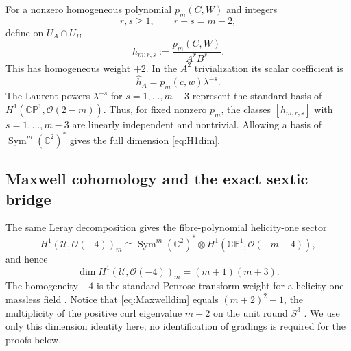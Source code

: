 \documentclass[aps,prd,reprint,nofootinbib,superscriptaddress]{revtex4-2}
\theoremstyle{definition}
\theoremstyle{remark}
\newcommand{\C}{\mathbb{C}}
\newcommand{\CP}{\mathbb{CP}}
\newcommand{\cO}{\mathcal{O}}
\newcommand{\cU}{\mathcal{U}}
\newcommand{\Sym}{\operatorname{Sym}}
\begin{document}
For a nonzero homogeneous polynomial $p_m(C,W)$ and integers
\begin{equation}
r,s\ge1,
\qquad r+s=m-2,
\label{eq:rs}
\end{equation}
define on $U_A\cap U_B$
\begin{equation}
h_{m;r,s}:=\frac{p_m(C,W)}{A^rB^s}.
\label{eq:hCech}
\end{equation}
This has homogeneous weight $+2$. In the $A^2$ trivialization its scalar coefficient is
\begin{equation}
\widehat h_A=p_m(c,w)\lambda^{-s}.
\label{eq:hhat}
\end{equation}
The Laurent powers $\lambda^{-s}$ for $s=1,\ldots,m-3$ represent the standard basis of $H^1(\CP^1,\cO(2-m))$. Thus, for fixed nonzero $p_m$, the classes $[h_{m;r,s}]$ with $s=1,\ldots,m-3$ are linearly independent and nontrivial. Allowing a basis of $\Sym^m(\C^2)^*$ gives the full dimension \eqref{eq:H1dim}.

\subsection{Maxwell cohomology and the exact sextic bridge}
\label{subsec:sexticbridge}

The same Leray decomposition gives the fibre-polynomial helicity-one sector
\begin{equation}
H^1(\cU,\cO(-4))_m
\cong
\Sym^m(\C^2)^*\otimes H^1(\CP^1,\cO(-m-4)),
\label{eq:Maxwellgraded}
\end{equation}
and hence
\begin{equation}
\dim H^1(\cU,\cO(-4))_m=(m+1)(m+3).
\label{eq:Maxwelldim}
\end{equation}
The homogeneity $-4$ is the standard Penrose-transform weight for a helicity-one massless field \cite{WardWells1990}.  Notice that \eqref{eq:Maxwelldim} equals $(m+2)^2-1$, the multiplicity of the positive curl eigenvalue $m+2$ on the unit round $S^3$ \cite{Baer2019}.  We use only this dimension identity here; no identification of gradings is required for the proofs below.
\end{document}
